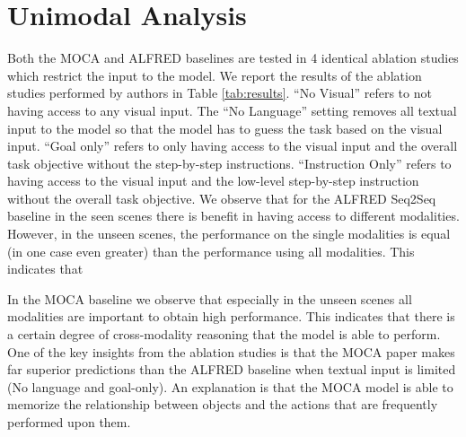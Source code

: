 \documentclass[11pt,a4paper]{article}
\begin{document}
\section{Unimodal Analysis}

Both the MOCA and ALFRED baselines are tested in 4 identical ablation studies which restrict the input to the model. We report the results of the ablation studies performed by authors in Table \ref{tab:results}. ``No Visual'' refers to not having access to any visual input.  The ``No Language'' setting removes all textual input to the model so that the model has to guess the task based on the visual input. ``Goal only'' refers to only having access to the visual input and the overall task objective without the step-by-step  instructions. ``Instruction Only'' refers to having access to the visual input and the low-level step-by-step instruction without the overall task objective. We observe that for the ALFRED Seq2Seq baseline in the seen scenes there is benefit in having access to different modalities. However, in the unseen scenes, the performance on the single modalities is equal (in one case even greater) than the performance using all modalities. This indicates that

In the MOCA baseline we observe that especially in the unseen scenes all modalities are important to obtain high performance. This indicates that there is a certain degree of cross-modality reasoning that the model is able to perform.
One of the key insights from the ablation studies is that the MOCA paper makes far superior predictions than the ALFRED baseline when textual input is limited (No language and goal-only). An explanation is that the MOCA model is able to memorize the relationship between objects and the actions that are frequently performed upon them.
\end{document}
